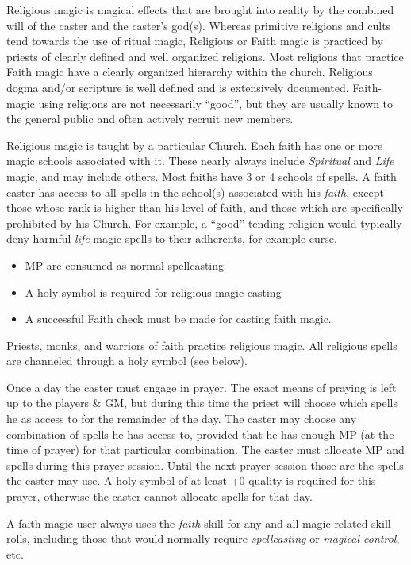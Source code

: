 Religious magic is magical effects that are brought into reality by
the combined will of the caster and the caster's god(s).  Whereas
primitive religions and cults tend towards the use of ritual magic,
Religious or Faith magic is practiced by priests of clearly defined
and well organized religions.  Most religions that practice Faith
magic have a clearly organized hierarchy within the church.  Religious
dogma and/or scripture is well defined and is extensively documented.
Faith-magic using religions are not necessarily ``good'', but they are
usually known to the general public and often actively recruit new
members.

Religious magic is taught by a particular Church. Each faith has one
or more magic schools associated with it.  These nearly always include
\emph{Spiritual} and \emph{Life} magic, and may include others.  Most
faiths have 3 or 4 schools of spells.  A faith caster has access to
all spells in the school(s) associated with his \emph{faith}, except
those whose rank is higher than his level of faith, and those which
are specifically prohibited by his Church.  For example, a ``good''
tending religion would typically deny harmful \emph{life}-magic spells
to their adherents, for example curse.

\begin{itemize}
\item	MP are consumed as normal spellcasting
\item	A holy symbol is required for religious magic casting
\item	A successful Faith check must be made for casting faith magic.
\end{itemize}

Priests, monks, and warriors of faith practice religious magic.  All
religious spells are channeled through a holy symbol (see below).

Once a day the caster must engage in prayer.  The exact means of
praying is left up to the players \& GM, but during this time the
priest will choose which spells he as access to for the remainder of
the day.  The caster may choose any combination of spells he has
access to, provided that he has enough MP (at the time of prayer) for
that particular combination.  The caster must allocate MP and spells
during this prayer session.  Until the next prayer session those are
the spells the caster may use.  A holy symbol of at least +0 quality
is required for this prayer, otherwise the caster cannot allocate
spells for that day.

A faith magic user always uses the \emph{faith} skill for any and all
magic-related skill rolls, including those that would normally require
\emph{spellcasting} or \emph{magical control}, etc.


